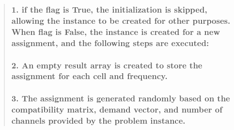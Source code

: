 \documentclass[11pt]{article}
\begin{document}
\begin{quote}
\hypertarget{if-the-flag-is-true-the-initialization-is-skipped-allowing-the-instance-to-be-created-for-other-purposes.-when-flag-is-false-the-instance-is-created-for-a-new-assignment-and-the-following-steps-are-executed}{%
\subsubsection{\texorpdfstring{ 1. if the flag is True, the
initialization is skipped, allowing the instance to be created for other
purposes. When flag is False, the instance is created for a new
assignment, and the following steps are
executed:}{  1. if the flag is True, the initialization is skipped, allowing the instance to be created for other purposes. When flag is False, the instance is created for a new assignment, and the following steps are executed:}}\label{if-the-flag-is-true-the-initialization-is-skipped-allowing-the-instance-to-be-created-for-other-purposes.-when-flag-is-false-the-instance-is-created-for-a-new-assignment-and-the-following-steps-are-executed}}

\hypertarget{an-empty-result-array-is-created-to-store-the-assignment-for-each-cell-and-frequency.}{%
\subsubsection{\texorpdfstring{ 2. An empty result array is created to
store the assignment for each cell and
frequency.}{  2. An empty result array is created to store the assignment for each cell and frequency.}}\label{an-empty-result-array-is-created-to-store-the-assignment-for-each-cell-and-frequency.}}

\hypertarget{the-assignment-is-generated-randomly-based-on-the-compatibility-matrix-demand-vector-and-number-of-channels-provided-by-the-problem-instance.}{%
\subsubsection{\texorpdfstring{ 3. The assignment is generated randomly
based on the compatibility matrix, demand vector, and number of channels
provided by the problem
instance.}{  3. The assignment is generated randomly based on the compatibility matrix, demand vector, and number of channels provided by the problem instance.}}\label{the-assignment-is-generated-randomly-based-on-the-compatibility-matrix-demand-vector-and-number-of-channels-provided-by-the-problem-instance.}}


\end{quote}
\end{document}

